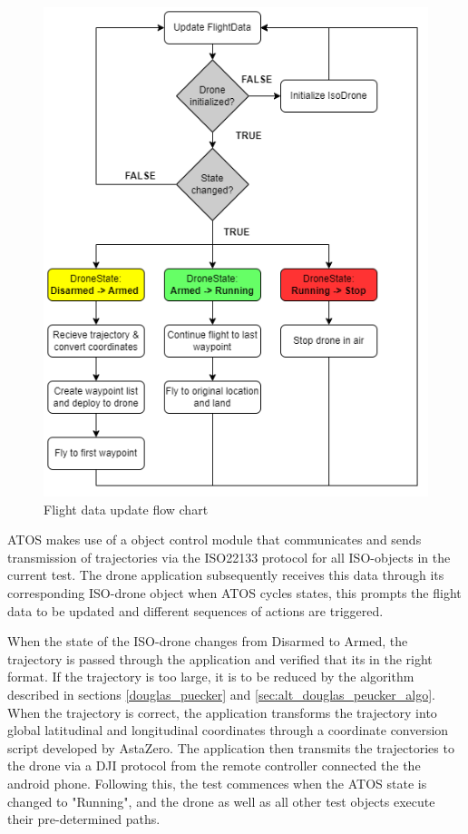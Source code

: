 \begin{figure}[H]
    \centering
    \includegraphics[scale=0.5]{figure/Flowchart-drone.png}
    \caption{Flight data update flow chart}
    \label{fig:drone-flow}
\end{figure}

ATOS makes use of a object control module that communicates and sends transmission of trajectories via the ISO22133 protocol for all ISO-objects in the current test. The drone application subsequently receives this data through its corresponding ISO-drone object when ATOS cycles states, this prompts the flight data to be updated and different sequences of actions are triggered.
\newline

When the state of the ISO-drone changes from Disarmed to Armed, the trajectory is passed through the application and verified that its in the right format. If the trajectory is too large, it is to be reduced by the algorithm described in sections \ref{douglas_puecker} and \ref{sec:alt_douglas_peucker_algo}. When the trajectory is correct, the application transforms the trajectory into global latitudinal and longitudinal coordinates through a coordinate conversion script developed by AstaZero. The application then transmits the trajectories to the drone via a DJI protocol from the remote controller connected the the android phone. Following this, the test commences when the ATOS state is changed to "Running", and the drone as well as all other test objects execute their pre-determined paths. 

